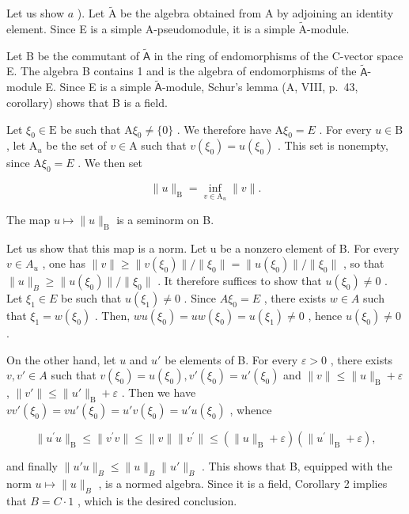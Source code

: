 Let us show \(a\) ). Let \(\widetilde{\mathrm{A}}\) be the algebra obtained from A by adjoining an identity element. Since E is a simple A-pseudomodule, it is a simple \(\widetilde{\mathrm{A}}\)-module.

Let B be the commutant of \(\tilde{\mathsf{A}}\) in the ring of endomorphisms of the C-vector space E. The algebra B contains 1 and is the algebra of endomorphisms of the \(\tilde{\mathsf{A}}\)-module E. Since E is a simple \(\tilde{\mathsf{A}}\)-module, Schur's lemma (A, VIII, p.~43, corollary) shows that B is a field.

Let \(\xi_0\in \mathrm{E}\) be such that \(\mathrm{A}\xi_0\neq\{0\}\) . We therefore have \(\mathrm{A}\xi_0 = E\) . For every \(u\in \mathrm{B}\) , let \(\mathrm{A}_u\) be the set of \(v\in \mathrm{A}\) such that \(v(\xi_0) = u(\xi_0)\) . This set is nonempty, since \(\mathrm{A}\xi_0 = E\) . We then set

\[
\| u \| _ {\mathrm{B}} = \inf _ {v \in \mathrm{A} _ {u}} \| v \|.
\]

The map \(u \mapsto \|u\|_{\mathrm{B}}\) is a seminorm on B.

Let us show that this map is a norm. Let u be a nonzero element of B. For every \(v \in A_{u}\) , one has \(\|v\| \geqslant \|v(\xi_{0})\|/\|\xi_{0}\| = \|u(\xi_{0})\|/\|\xi_{0}\|\) , so that \(\|u\|_{B} \geqslant \|u(\xi_{0})\|/\|\xi_{0}\|\) . It therefore suffices to show that \(u(\xi_{0}) \neq 0\) . Let \(\xi_{1} \in E\) be such that \(u(\xi_{1}) \neq 0\) . Since \(A\xi_{0} = E\) , there exists \(w \in A\) such that \(\xi_{1} = w(\xi_{0})\) . Then, \(wu(\xi_{0}) = uw(\xi_{0}) = u(\xi_{1}) \neq 0\) , hence \(u(\xi_{0}) \neq 0\) .

On the other hand, let \(u\) and \(u'\) be elements of B. For every \(\varepsilon > 0\) , there exists \(v, v' \in A\) such that \(v(\xi_0) = u(\xi_0), v'(\xi_0) = u'(\xi_0)\) and \(\|v\| \leqslant \|u\|_{\mathrm{B}} + \varepsilon\) , \(\|v'\| \leqslant \|u'\|_{\mathrm{B}} + \varepsilon\) . Then we have \(vv'(\xi_0) = vu'(\xi_0) = u'v(\xi_0) = u'u(\xi_0)\) , whence

\[
\| u ^ {\prime} u \| _ {\mathrm{B}} \leqslant \| v ^ {\prime} v \| \leqslant \| v \| \| v ^ {\prime} \| \leqslant (\| u \| _ {\mathrm{B}} + \varepsilon) (\| u ^ {\prime} \| _ {\mathrm{B}} + \varepsilon),
\]

and finally \(\|u'u\|_{B} \leqslant \|u\|_{B} \|u'\|_{B}\) . This shows that B, equipped with the norm \(u \mapsto \|u\|_{B}\) , is a normed algebra. Since it is a field, Corollary 2 implies that \(B = C \cdot 1\) , which is the desired conclusion.

